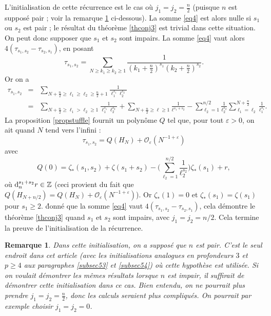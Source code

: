 \documentclass[12pt,francais, reqno]{smfart}
\numberwithin{equation}{section}
\newcommand{\dd}{\textup{d}}
\def\dd{\textup{d}}
\newcommand{\Z}{\mathbb Z}
\newcommand{\gdo}{\mathcal{O}}
\newcommand{\eps}{\varepsilon}
\newcommand{\zetaetoile}{\zeta _*}
\newtheorem{remark}{Remarque}[subsection]
\begin{document}
L'initialisation de cette r\'ecurrence est le cas o\`u $j_1 = j_2 = \frac{n}{2}$ (puisque $n$ est suppos\'e pair ; voir la remarque \ref{rqparite} ci-dessous).  La somme \eqref{eq4} est alors nulle si $s_1 $ ou $s_2$ est pair ; le r\'esultat du th\'eor\`eme \ref{thconj3} est trivial dans cette situation. On peut donc supposer que $s_1$ et $s_2$ sont impairs. La somme \eqref{eq4} vaut alors $4(\tau_{s_1, s_2} - \tau_{s_2, s_1})$, en posant 
$$\tau_{s_1, s_2} = \sum_{N \geq k_1 \geq k_2 \geq 1} \frac{1}{(k_1 + \frac{n}{2})^{s_1}  (k_2 + \frac{n}{2})^{s_2}}.$$
Or on a 
\begin{eqnarray*}
\tau_{s_1, s_2} 
&=&  \sum_{N + \frac{n}{2} \geq \ell_1 \geq \ell_2 \geq  \frac{n}{2} + 1} \frac{1}{\ell_1^{s_1} \ell_2^{s_2}}\\
&=&  \sum_{N + \frac{n}{2} \geq \ell_1 > \ell_2 \geq  1} \frac{1}{\ell_1^{s_1} \ell_2^{s_2}} 
+ \sum_{N + \frac{n}{2} \geq \ell  \geq  1} \frac{1}{\ell^{s_1+s_2}} 
- \sum_{\ell_2 = 1} ^{n/2}  
\frac{1}{\ell_2^{s_2}} \sum_{\ell_1 = \ell_2} ^{N + \frac{n}{2}} \frac{1}{\ell_1^{s_1}}.
\end{eqnarray*}
La proposition \ref{propstuffle} fournit un polyn\^ome $Q$ tel que, pour tout $\eps > 0$, on ait quand $N$ tend vers l'infini : 
$$\tau_{s_1, s_2}  = Q(H_N) +  \gdo_\eps (N^{-1+\eps})$$
avec 
$$Q(0) = \zetaetoile (s_1,s_2) + \zeta(s_1+s_2) - \Big( \sum_{\ell_2 = 1} ^{n/2} \frac{1}{\ell_2 ^{s_2}} \Big)  \zetaetoile(s_1) + r ,$$
o\`u $\dd_n ^{s_1+s_2} r \in \Z$ (ceci provient du fait que $ Q(H_{N+n/2}) = Q(H_N) +  \gdo_\eps (N^{-1+\eps})$).
Or $\zetaetoile(1) = 0$ et $\zetaetoile(s_1) = \zeta(s_1)$ pour $s_1 \geq 2$. \'donn\'e que la somme \eqref{eq4} vaut  $4(\tau_{s_1, s_2} - \tau_{s_2, s_1})$, cela d\'emontre le th\'eor\`eme \ref{thconj3}  quand $s_1$ et $s_2$ sont impairs, avec $j_1 = j_2 = n/2$. Cela termine la preuve de l'initialisation de la r\'ecurrence.

\bigskip

\begin{remark} \label{rqparite} Dans cette initialisation, on a suppos\'e que $n$ est pair. C'est le seul endroit dans cet article (avec les initialisations analogues en profondeurs $3$ et $p \geq 4$ aux paragraphes \ref{subsec53} et \ref{subsec54})  o\`u cette hypoth\`ese est utilis\'ee. Si on voulait d\'emontrer les m\^emes r\'esultats lorsque $n$ est impair, il suffirait de d\'emontrer cette initialisation dans ce cas. Bien entendu, on ne pourrait plus prendre $j_1 = j_2 = \frac{n}{2}$, donc les calculs seraient plus compliqu\'es. On pourrait par exemple choisir  $j_1 = j_2 =0$. 
\end{remark}
\end{document}
